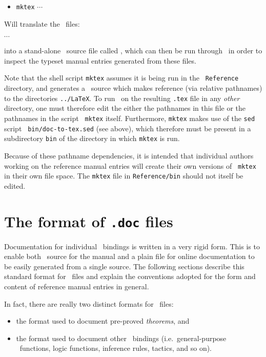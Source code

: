 \begin{itemize}
\item {\tt mktex}\sp
{}\sp {}\sp $\cdots$ \sp {}\sp {\tt >}\sp
{}
\end{itemize}

\noindent Will translate the \doc\ files:

\medskip

\noindent \qquad {}\doc\sp\sp {}\doc\sp\sp $\cdots$ \sp\sp
{}\doc

\medskip

\noindent into a stand-alone \latex\ source file called , which
can then be run through \latex\ in order to inspect the typeset manual entries
generated from these files.

Note that the shell script {\tt mktex} assumes it is being run in the {\tt
Reference} directory, and generates a \latex\ source which makes reference (via
relative pathnames) to the directories {\tt ../LaTeX}.  To run \latex\ on the
resulting {\tt .tex} file in any {\it other\/} directory, one must therefore
edit the either the pathnames in this file or the pathnames in the script {\tt
mktex} itself.  Furthermore, {\tt mktex} makes use of the {\tt sed} script {\tt
bin/doc-to-tex.sed} (see above), which therefore must be present in a
subdirectory {\tt bin} of the directory in which {\tt mktex} is run.

Because of these pathname dependencies, it is intended that individual authors
working on the reference manual entries will create their own versions of {\tt
mktex} in their own file space.  The {\tt mktex} file in {\tt Reference/bin}
should not itself be edited.

\section{The format of {\tt .doc} files}

Documentation for individual \ML\ bindings is written in a very rigid form.
This is to enable both \latex\ source for the manual and a plain file for
online documentation to be easily generated from a single source. The following
sections describe this standard format for \doc\ files and explain the
conventions adopted for the form and content of reference manual entries in
general.

In fact, there are really two distinct formats for \doc\ files:

\begin{itemize}
\item the format used to document pre-proved {\it theorems\/}, and
\item the format used to document other \ML\ bindings (i.e.\ general-purpose
\ML\ functions, logic functions, inference rules, tactics, and so on).
\end{itemize}

